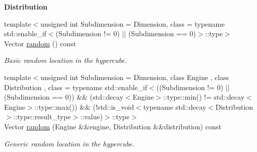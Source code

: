 \begin{Indent}{\bf Distribution}\par
\begin{DoxyCompactItemize}
\item 
{\footnotesize template$<$unsigned int Subdimension = Dimension, class  = typename std\-::enable\-\_\-if$<$(\-Subdimension != 0) $|$$|$ (\-Subdimension == 0)$>$\-::type$>$ }\\Vector \hyperlink{classmagrathea_1_1AbstractHyperCube_aa071c3abcff00828d27f13454fcf604d}{random} () const 
\begin{DoxyCompactList}\small\item\em Basic random location in the hypercube. \end{DoxyCompactList}\item 
{\footnotesize template$<$unsigned int Subdimension = Dimension, class Engine , class Distribution , class  = typename std\-::enable\-\_\-if$<$((\-Subdimension != 0) $|$$|$ (\-Subdimension == 0)) \&\& (std\-::decay$<$\-Engine$>$\-::type\-::min() != std\-::decay$<$\-Engine$>$\-::type\-::max()) \&\& (!std\-::is\-\_\-void$<$typename std\-::decay$<$\-Distribution$>$\-::type\-::result\-\_\-type$>$\-::value)$>$\-::type$>$ }\\Vector \hyperlink{classmagrathea_1_1AbstractHyperCube_aa529bedcd503631825f7e21b893e3d7e}{random} (Engine \&\&engine, Distribution \&\&distribution) const 
\begin{DoxyCompactList}\small\item\em Generic random location in the hypercube. \end{DoxyCompactList}\end{DoxyCompactItemize}
\end{Indent}
